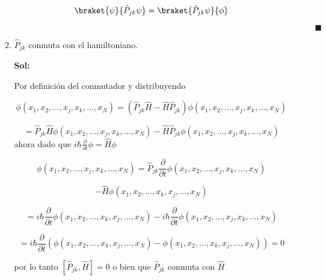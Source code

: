 \documentclass[12pt,a4paper]{article}
\begin{document}
\begin{enumerate}
\begin{enumerate}
    \begin{equation*}
       \braket{\psi}{\hat{P}_{jk} \psi} = \braket{\hat{P}_{jk}\psi}{\phi}
    \end{equation*}
    
    
    
    $\hspace{15cm} \blacksquare $
    
    
    
    \item $\hat{P}_{jk}$ conmuta con el hamiltoniano.
    
    \textbf{Sol:}
    
    Por definición del conmutador y distribuyendo
    
    \begin{equation*}
        [\hat{P}_{jk}, \hat{H}] \phi(x_1,x_2,...,x_j,x_k,...,x_N) =(\hat{P}_{jk} \hat{H} - \hat{H} \hat{P}_{jk}) \phi(x_1,x_2,...,x_j,x_k,...,x_N)
    \end{equation*}
    
    \begin{equation*}
        = \hat{P}_{jk} \hat{H}  \phi(x_1,x_2,...,x_j,x_k,...,x_N) - \hat{H} \hat{P}_{jk} \phi(x_1,x_2,...,x_j,x_k,...,x_N)
    \end{equation*}
    ahora dado que $i \hbar \frac{\partial}{\partial t} \phi = \hat{H} \phi$ 
    
    \begin{equation*}
        [\hat{P}_{jk}, \hat{H}] \phi(x_1,x_2,...,x_j,x_k,...,x_N) = \hat{P}_{jk} \frac{\partial}{\partial t}  \phi(x_1,x_2,...,x_j,x_k,...,x_N)
    \end{equation*}
    
    \begin{equation*}
        - \hat{H}\phi(x_1,x_2,...,x_k,x_j,...,x_N)
    \end{equation*}
    
    \begin{equation*}
        =i \hbar \frac{\partial}{\partial t}  \phi(x_1,x_2,...,x_k,x_j,...,x_N) - i \hbar \frac{\partial}{\partial t} \phi(x_1,x_2,...,x_j,x_k,...,x_N)
    \end{equation*}
    
    \begin{equation*}
        = i \hbar \frac{\partial}{ \partial t} (\phi(x_1,x_2,...,x_k,x_j,...,x_N) - \phi(x_1,x_2,...,x_k,x_j,...,x_N) ) = 0
    \end{equation*}
    
    por lo tanto $[\hat{P}_{jk}, \hat{H}] = 0$ o bien que $\hat{P}_{jk}$ conmuta con $\hat{H}$
    

\end{enumerate}
\end{enumerate}
\end{document}
